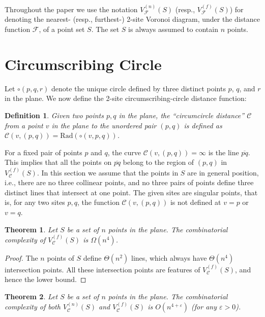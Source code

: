 \documentclass[10pt, conference, compsocconf]{IEEEtran}
\newtheorem{theorem}{Theorem}
\newtheorem{definition}{Definition}
\def\C{{\mathcal C}}
\def\F{{\mathcal F}}
\newcommand{\eps}{\varepsilon}
\begin{document}
Throughout the paper we use the notation $V_\F^{(n)}(S)$ (resp.,
$V_\F^{(f)}(S)$) for denoting the nearest- (resp., furthest-) 2-site Voronoi
diagram, under the distance function $\F$, of a point set $S$.
The set $S$ is always assumed to contain $n$ points.



\section{Circumscribing Circle}

\label{S-circum-cir}

Let $\circ(p,q,r)$ denote the unique circle defined by three distinct
points $p$, $q$, and $r$ in the plane.  We now define the 2-site
circumscribing-circle distance function:
\begin{definition}
   Given two points $p,q$ in the plane, the ``circumcircle distance''
   $\C$ from a point $v$ in the plane to the unordered pair $(p,q)$ is
   defined as $\C(v,(p,q)) = \mathrm{Rad}(\circ(v,p,q))$.
\end{definition}
For a fixed pair of points $p$ and $q$, the curve
$\C(v,(p,q)) = \infty$ is the line $\overline{pq}$.
This implies that all the points on $\overline{pq}$ belong to
the region of $(p,q)$ in $V_{\C}^{(f)}(S)$. In this
section we assume that the points in $S$ are in general position,
i.e., there are no three collinear points, and no three pairs of
points define three distinct lines that intersect at one point.
The given sites are singular points, that is, for any two sites
$p,q$, the function $\C(v,(p,q))$ is not defined at $v=p$ or $v=q$.

\begin{theorem}
   Let $S$ be a set of $n$ points in the plane.
   The combinatorial complexity of $V_{\C}^{(f)}(S)$ is $\Omega(n^4)$.
\end{theorem}

\begin{proof}
   The $n$ points of $S$ define $\Theta(n^2)$ lines, which always have
   $\Theta(n^4)$ intersection points.  All these intersection points
   are features of $V_{\C}^{(f)}(S)$, and hence the lower bound.
\end{proof}

\begin{theorem}
   \label{TH-ub-circ}
   Let $S$ be a set of $n$ points in the plane.
   The combinatorial complexity of both $V_{\C}^{(n)}(S)$ and
   $V_{\C}^{(f)}(S)$ is $O(n^{4+\eps})$ (for any $\eps > 0$).
\end{theorem}
\end{document}
